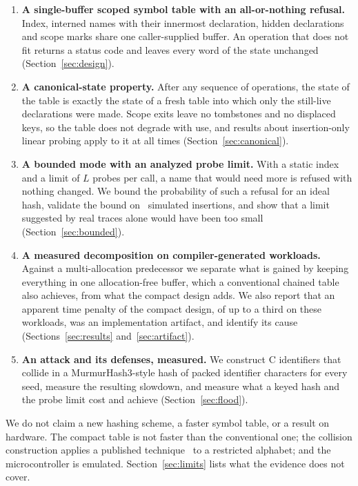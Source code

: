 \begin{enumerate}
\item \textbf{A single-buffer scoped symbol table with an all-or-nothing refusal.} Index, interned names with their innermost declaration, hidden declarations and scope marks share one caller-supplied buffer. An operation that does not fit returns a status code and leaves every word of the state unchanged (Section~\ref{sec:design}).
\item \textbf{A canonical-state property.} After any sequence of operations, the state of the table is exactly the state of a fresh table into which only the still-live declarations were made. Scope exits leave no tombstones and no displaced keys, so the table does not degrade with use, and results about insertion-only linear probing apply to it at all times (Section~\ref{sec:canonical}).
\item \textbf{A bounded mode with an analyzed probe limit.} With a static index and a limit of $L$ probes per call, a name that would need more is refused with nothing changed. We bound the probability of such a refusal for an ideal hash, validate the bound on \ProbeTotal\ simulated insertions, and show that a limit suggested by real traces alone would have been too small (Section~\ref{sec:bounded}).
\item \textbf{A measured decomposition on compiler-generated workloads.} Against a multi-allocation predecessor we separate what is gained by keeping everything in one allocation-free buffer, which a conventional chained table also achieves, from what the compact design adds. We also report that an apparent time penalty of the compact design, of up to a third on these workloads, was an implementation artifact, and identify its cause (Sections~\ref{sec:results} and~\ref{sec:artifact}).
\item \textbf{An attack and its defenses, measured.} We construct C identifiers that collide in a MurmurHash3-style hash of packed identifier characters for every seed, measure the resulting slowdown, and measure what a keyed hash and the probe limit cost and achieve (Section~\ref{sec:flood}).
\end{enumerate}

We do not claim a new hashing scheme, a faster symbol table, or a result on hardware. The compact table is not faster than the conventional one; the collision construction applies a published technique~\cite{aumasson2012} to a restricted alphabet; and the microcontroller is emulated. Section~\ref{sec:limits} lists what the evidence does not cover.

